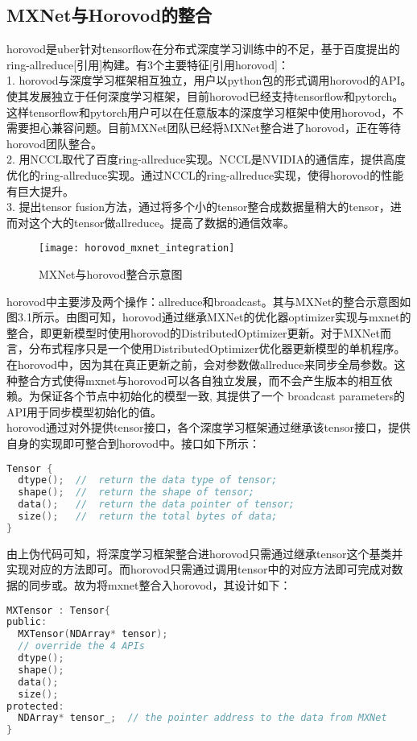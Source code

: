 \subsection{MXNet与Horovod的整合}
horovod是uber针对tensorflow在分布式深度学习训练中的不足，基于百度提出的ring-allreduce[引用]构建。有3个主要特征[引用horovod]：\\
1. horovod与深度学习框架相互独立，用户以python包的形式调用horovod的API。使其发展独立于任何深度学习框架，目前horovod已经支持tensorflow和pytorch。这样tensorflow和pytorch用户可以在任意版本的深度学习框架中使用horovod，不需要担心兼容问题。目前MXNet团队已经将MXNet整合进了horovod，正在等待horovod团队整合。\\
2. 用NCCL取代了百度ring-allreduce实现。NCCL是NVIDIA的通信库，提供高度优化的ring-allreduce实现。通过NCCL的ring-allreduce实现，使得horovod的性能有巨大提升。\\
3. 提出tensor fusion方法，通过将多个小的tensor整合成数据量稍大的tensor，进而对这个大的tensor做allreduce。提高了数据的通信效率。\\
\begin{figure}[htp]
\centering
\texttt{[image: horovod\_mxnet\_integration]}
\caption{MXNet与horovod整合示意图}
\end{figure}
horovod中主要涉及两个操作：allreduce和broadcast。其与MXNet的整合示意图如图3.1所示。由图可知，horovod通过继承MXNet的优化器optimizer实现与mxnet的整合，即更新模型时使用horovod的DistributedOptimizer更新。对于MXNet而言，分布式程序只是一个使用DistributedOptimizer优化器更新模型的单机程序。在horovod中，因为其在真正更新之前，会对参数做allreduce来同步全局参数。这种整合方式使得mxnet与horovod可以各自独立发展，而不会产生版本的相互依赖。为保证各个节点中初始化的模型一致, 其提供了一个 broadcast parameters的API用于同步模型初始化的值。\\
horovod通过对外提供tensor接口，各个深度学习框架通过继承该tensor接口，提供自身的实现即可整合到horovod中。接口如下所示：
\begin{lstlisting}[language=C, numbers=none]
Tensor {
  dtype();  //  return the data type of tensor;
  shape();  //  return the shape of tensor;
  data();   //  return the data pointer of tensor;
  size();   //  return the total bytes of data;
}
\end{lstlisting}
由上伪代码可知，将深度学习框架整合进horovod只需通过继承tensor这个基类并实现对应的方法即可。而horovod只需通过调用tensor中的对应方法即可完成对数据的同步或。故为将mxnet整合入horovod，其设计如下：
\begin{lstlisting}[language=C, numbers=none]
MXTensor : Tensor{
public:
  MXTensor(NDArray* tensor);
  // override the 4 APIs
  dtype();
  shape();
  data();
  size();
protected:
  NDArray* tensor_;  // the pointer address to the data from MXNet
}
\end{lstlisting}
